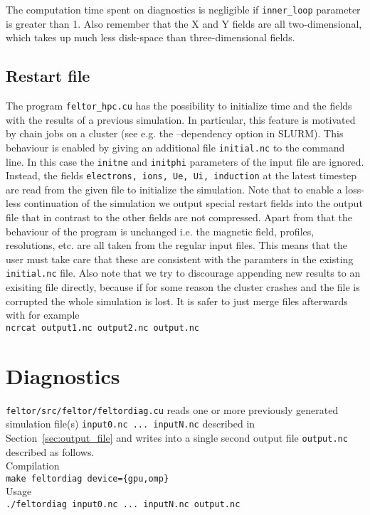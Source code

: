 The computation time spent on diagnostics is negligible if {\tt inner\_loop} parameter is greater than 1. Also
remember that the X and Y fields are all two-dimensional, which takes up much less disk-space than three-dimensional fields.
\subsection{Restart file} \label{sec:restart_file}
The program \texttt{feltor\_hpc.cu} has the possibility to initialize time and the fields with
the results of a previous simulation. In particular, this feature is motivated by chain jobs on a cluster
(see e.g. the --dependency option in SLURM).
This behaviour is enabled by giving an additional file \texttt{initial.nc}
to the command line. In this case the \texttt{initne} and \texttt{initphi} parameters of the input
file are ignored. Instead, the fields \texttt{electrons, ions, Ue, Ui, induction} at the latest timestep
are read from the given file to initialize the simulation.
Note that to enable a loss-less continuation of the simulation we output special restart fields into the output file that in contrast to the other fields
are not compressed.
Apart from that the behaviour of the program is unchanged i.e. the magnetic field, profiles, resolutions, etc.
are all taken from the regular input files. This means that the user must take care that these are consistent
with the paramters in the existing \texttt{initial.nc} file. Also note that we try to discourage
appending new results to an exisiting file directly,
because if for some reason the cluster crashes and the file is corrupted
the whole simulation is lost. It is safer to just merge files afterwards with for example\\
\texttt{ncrcat output1.nc output2.nc output.nc}
\section{Diagnostics}\label{sec:diagnostics}
\texttt{feltor/src/feltor/feltordiag.cu}
 reads one or more previously generated simulation file(s) \texttt{input0.nc ... inputN.nc} described in Section~\ref{sec:output_file} and writes into a single second output file \texttt{output.nc} described as follows. \\
Compilation\\
\texttt{make feltordiag device=\{gpu,omp\}} \\
Usage \\
\texttt{./feltordiag input0.nc ... inputN.nc output.nc} \\


